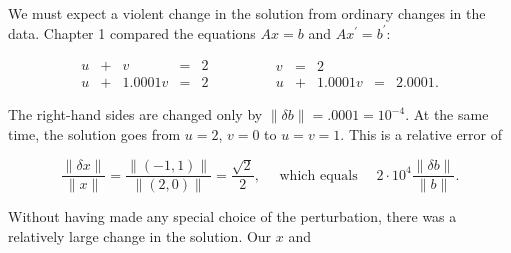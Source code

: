 We must expect a violent change in the solution from ordinary changes in the data. Chapter 1 compared the equations \(Ax=b\) and \(Ax^{\prime}=b^{\prime}\):

\[\begin{array}{rclrclrclrcl}u&+&v&=&2\\ u&+&1.0001v&=&2\end{array}\qquad\qquad\begin{array}{rclrclrclrcl}v&=&2\\ u&+&1.0001v&=&2.0001.\end{array}\]

The right-hand sides are changed only by \(\|\delta b\|=.0001=10^{-4}\). At the same time, the solution goes from \(u=2\), \(v=0\) to \(u=v=1\). This is a relative error of

\[\frac{\|\delta x\|}{\|x\|}=\frac{\|(-1,1)\|}{\|(2,0)\|}=\frac{\sqrt{2}}{2}, \quad\mbox{ which equals }\quad 2\cdot 10^{4}\frac{\|\delta b\|}{\|b\|}.\]

Without having made any special choice of the perturbation, there was a relatively large change in the solution. Our \(x\) and 